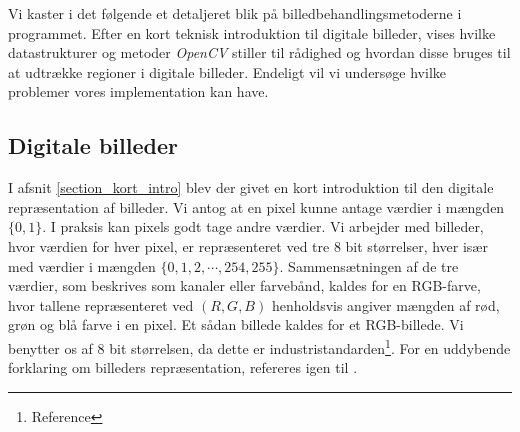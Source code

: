 {
{\sffamily Vi kaster i det følgende et detaljeret blik på
billedbehandlingsmetoderne i programmet. Efter en kort teknisk
introduktion til digitale billeder, vises hvilke datastrukturer og
metoder \emph{OpenCV} stiller til rådighed og hvordan disse bruges til
at udtrække regioner i digitale billeder. Endeligt vil vi undersøge
hvilke problemer vores implementation kan have.
}

\subsection{Digitale billeder}
I afsnit \ref{section_kort_intro} blev der givet en kort introduktion
til den digitale repræsentation af billeder. Vi antog at en pixel kunne
antage værdier i mængden $\{0, 1\}$. I praksis kan pixels godt tage
andre værdier. Vi arbejder med billeder, hvor værdien for hver pixel, er
repræsenteret ved tre 8 bit størrelser, hver især med værdier i mængden
$\{0, 1, 2, \cdots, 254, 255\}$. Sammensætningen af de tre værdier, som
beskrives som kanaler eller farvebånd, kaldes for en RGB-farve, hvor
tallene repræsenteret ved $(R,G,B)$ henholdsvis angiver mængden af rød,
grøn og blå farve i en pixel. Et sådan billede kaldes for et
RGB-billede.  Vi benytter os af 8 bit størrelsen, da dette er
industristandarden\footnote{Reference}. For en uddybende forklaring om
billeders repræsentation, refereres igen til \cite{SIOlsen}.


}
